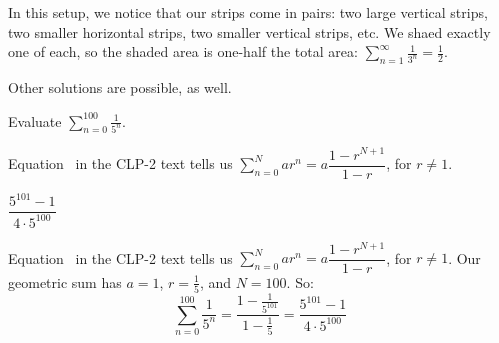 \begin{solution}
In this setup, we notice that our strips come in pairs: two large vertical strips, two smaller horizontal strips, two smaller vertical strips, etc. We shaed exactly one of each, so the shaded area is one-half the total area: $\displaystyle\sum_{n=1}^\infty \frac{1}{3^n} = \frac12$.

Other solutions are possible, as well.
\end{solution}



\begin{question}
Evaluate $\displaystyle\sum_{n=0}^{100}\frac{1}{5^n}$.
\end{question}
\begin{hint}
Equation~ in the CLP-2 text tells us
$\displaystyle\sum_{n=0}^N ar^n = a\dfrac{1-r^{N+1}}{1-r}$, for $r \neq 1$.
\end{hint}
\begin{answer}
$\dfrac{5^{101}-1}{4\cdot 5^{100}}$
\end{answer}
\begin{solution}
Equation~ in the CLP-2 text tells us
$\displaystyle\sum_{n=0}^N ar^n = a\dfrac{1-r^{N+1}}{1-r}$, for $r \neq 1$.
Our geometric sum has $a=1$, $r=\frac{1}{5}$, and $N=100$. So:
\[\displaystyle\sum_{n=0}^{100}\frac{1}{5^n} =
\frac{1-\frac{1}{5^{101}}}{1-\frac{1}{5}} = \dfrac{5^{101}-1}{4\cdot 5^{100}}\]
\end{solution}

